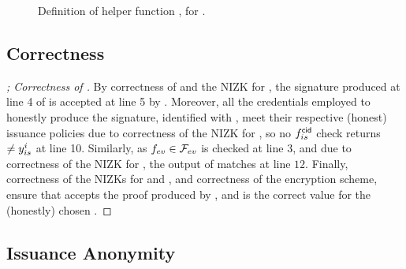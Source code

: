 \begin{figure}[ht!]
{\begin{minipage}[t]{\textwidth}
      
    \end{minipage}
  }
  \label{fig:helper-funcs}
  \caption{Definition of helper function \SimSetup, for \CUASGen.}
\end{figure}

\subsection{Correctness}

\begin{proof}[; Correctness of \CUASGen]
  By correctness of \SBCM and the NIZK for \RelSig, the signature
  produced at line 4 of \ExpCorrect is accepted at line 5 by \Verify.
  Moreover, all the credentials employed to honestly produce the signature,
  identified with \scid, meet their respective (honest) issuance policies due to
  correctness of the NIZK for \RelIss, so no $f_{is}^{\mathsf{cid}}$ check
  returns $\neq y_{is}^i$ at line 10. Similarly, as $f_{ev} \in \mathcal{F}_{ev}$ is
  checked at line 3, and due to correctness of the NIZK for \RelSig,
  the output of \feval matches \yeval at line $12$. Finally, correctness of the
  NIZKs for \RelSig and \RelIns, and correctness of the encryption scheme,
  ensure that \Judge accepts the proof produced by \Open, and \yinsp is the
  correct value for the (honestly) chosen \finsp.
\end{proof}

\subsection{Issuance Anonymity}

